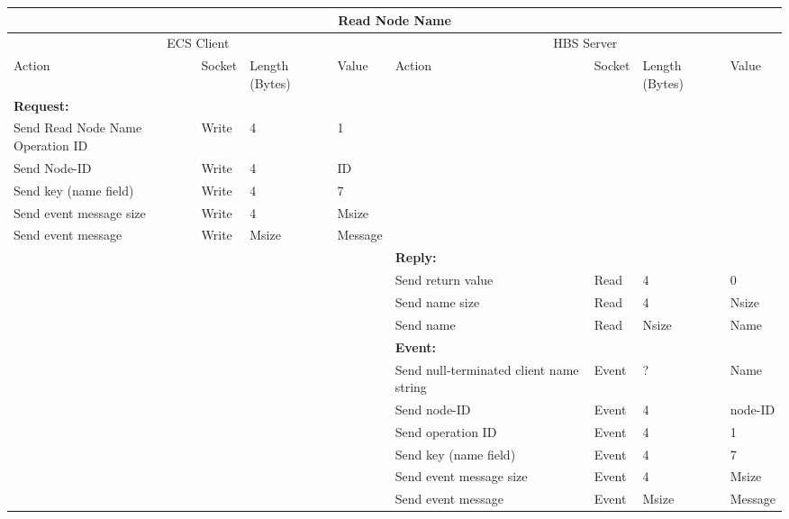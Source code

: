 \bigskip
\small
\begin{tabular}{|p{1.2in}|p{.4in}|p{.4in}|p{.5in}|p{1.2in}|p{.4in}|p{.4in}|p{.5in} |} \hline
\multicolumn{8}{|c|}{{\bf Read Node Name}} \\ \hline
\multicolumn{4}{|c|}{ECS Client} & \multicolumn{4}{|c|}{HBS Server} \\ \hline
Action            & Socket & Length  
                            (Bytes)& Value & Action       & Socket & Length 
                                                                    (Bytes)& Value \\ \hline
\multicolumn{4}{|l}{{\bf Request:}}&\multicolumn{4}{|l|}{~} \\ \hline
Send Read Node Name  Operation ID  & Write  & 4     & 1     &              &        &       &       \\ \hline
Send Node-ID      & Write  & 4     &  ID &           &        &       &       \\ \hline
Send key (name field)    & Write  & 4     & 7   &              &        &       &       \\ \hline
Send event
message size      & Write  & 4     &  Msize &         &        &       &       \\ \hline
Send event message
                  & Write  &  Msize  &  Message &     &        &       &       \\ \hline
\multicolumn{4}{|l}{~}&\multicolumn{4}{|l|}{{\bf Reply:}} \\ \hline
                  &        &       &       & Send return
                                             value        & Read   &  4    & 0       \\ \hline
                  &        &       &       & Send name size & Read &  4    &  Nsize \\ \hline
                  &        &       &       & Send name    & Read   & Nsize &  Name \\ \hline
\multicolumn{4}{|l}{~}&\multicolumn{4}{|l|}{{\bf Event:}} \\ \hline
                  &        &       &       & Send null-terminated client
                                             name string  & Event  &  ?    & Name  \\ \hline
                  &        &       &       & Send node-ID  & Event  &   4   &   node-ID    \\  \hline
                  &        &       &       & Send operation 
                                             ID           & Event  &   4   &  1   \\ \hline
                  &        &       &       & Send key (name field)     & Event  &   4   &  7    \\ \hline
                  &        &       &       & Send event message
                                                  size    & Event  &   4   &  Msize \\ \hline
                  &        &       &       & Send event message
                                                          & Event  & Msize& Message  \\ \hline
\end{tabular}
\normalsize
\bigskip



